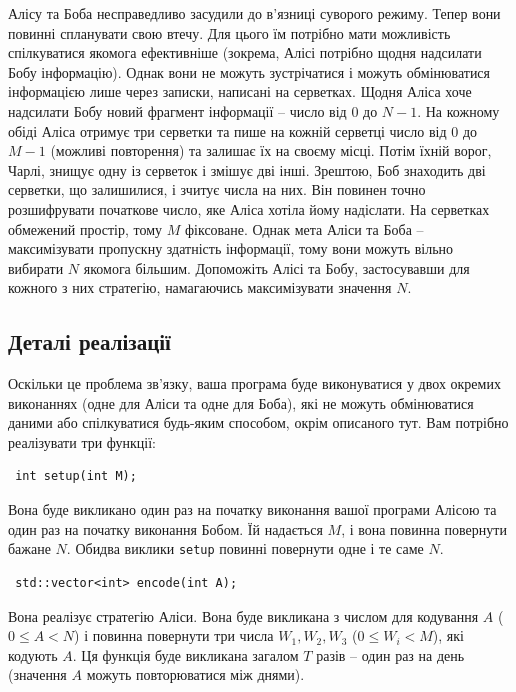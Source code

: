 \documentclass[12pt]{article}
\begin{document}
\renewcommand{\round}{Day 1}
\renewcommand{\problemName}{Problem Prison}
\renewcommand{\lang}{Ukrainian}

\renewcommand{\tl}{$2$ sec.}
\renewcommand{\ml}{$1024$ MB}

Алісу та Боба несправедливо засудили до в'язниці суворого режиму. Тепер вони повинні спланувати свою втечу. Для цього їм потрібно мати можливість спілкуватися якомога ефективніше (зокрема, Алісі потрібно щодня надсилати Бобу інформацію). Однак вони не можуть зустрічатися і можуть обмінюватися інформацією лише через записки, написані на серветках. Щодня Аліса хоче надсилати Бобу новий фрагмент інформації – число від $0$ до $N-1$. На кожному обіді Аліса отримує три серветки та пише на кожній серветці число від $0$ до $M-1$ (можливі повторення) та залишає їх на своєму місці. Потім їхній ворог, Чарлі, знищує одну із серветок і змішує дві інші. Зрештою, Боб знаходить дві серветки, що залишилися, і зчитує числа на них. Він повинен точно розшифрувати початкове число, яке Аліса хотіла йому надіслати. На серветках обмежений простір, тому $M$ фіксоване. Однак мета Аліси та Боба – максимізувати пропускну здатність інформації, тому вони можуть вільно вибирати $N$ якомога більшим. Допоможіть Алісі та Бобу, застосувавши для кожного з них стратегію, намагаючись максимізувати значення $N$.

\subsection{Деталі реалізації}
Оскільки це проблема зв'язку, ваша програма буде виконуватися у двох окремих виконаннях (одне для Аліси та одне для Боба), які не можуть обмінюватися даними або спілкуватися будь-яким способом, окрім описаного тут. Вам потрібно реалізувати три функції:

\begin{lstlisting}
 int setup(int M);
\end{lstlisting}

Вона буде викликано один раз на початку виконання вашої програми Алісою та один раз на початку виконання Бобом. Їй надається $M$, і вона повинна повернути бажане $N$. Обидва виклики \texttt{setup} повинні повернути одне і те саме $N$.

\begin{lstlisting}
 std::vector<int> encode(int A);
\end{lstlisting}

Вона реалізує стратегію Аліси. Вона буде викликана з числом для кодування $A$ ($0 \leq A < N$) і повинна повернути три числа $W_1, W_2, W_3$ ($0 \leq W_i < M$), які кодують $A$. Ця функція буде викликана загалом $T$ разів -- один раз на день (значення $A$ можуть повторюватися між днями).
\end{document}
